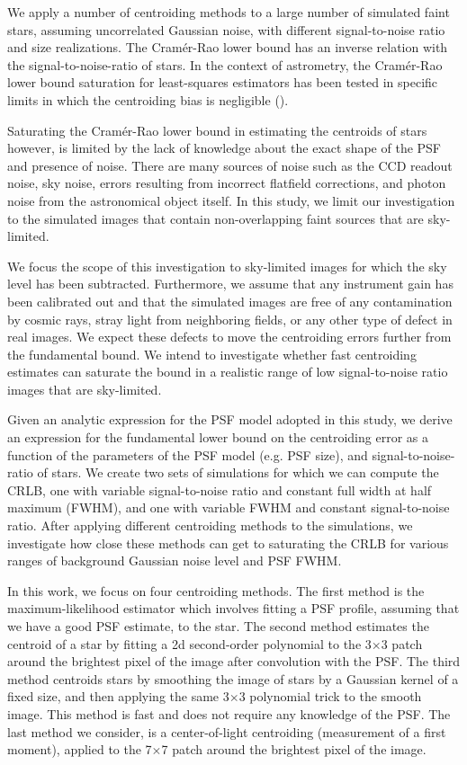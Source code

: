 We apply a number of 
centroiding methods to a large number of simulated faint stars, assuming uncorrelated 
Gaussian noise, with different signal-to-noise ratio and size realizations. 
The Cram\'{e}r-Rao lower bound has an inverse relation with the signal-to-noise-ratio 
of stars. In the context of astrometry, the Cram\'{e}r-Rao lower bound saturation for least-squares estimators has been tested in specific limits in which the centroiding bias is negligible (\citealt{lobos}). 

Saturating the Cram\'{e}r-Rao lower bound in estimating the centroids of stars however, is limited
by the lack of knowledge about the exact shape of the PSF and presence of noise. 
There are many sources of noise such as the CCD readout noise, sky noise, errors resulting from 
incorrect flatfield corrections, and photon noise from the astronomical object itself. 
In this study, we limit our investigation to the simulated images that contain non-overlapping faint sources that are sky-limited. 

We focus the scope of this investigation to sky-limited images for which the sky level has been subtracted. Furthermore, we assume that any instrument gain has been calibrated out and that the 
simulated images are free of any contamination by cosmic rays, stray light from neighboring fields, or 
any other type of defect in real images. We expect these defects to move the centroiding errors further from the 
fundamental bound. We intend to investigate whether fast centroiding estimates can saturate the bound 
in a realistic range of low signal-to-noise ratio images that are sky-limited. 

Given an analytic expression for the PSF model adopted in this study,
we derive an expression for the fundamental lower bound on the centroiding error as
a function of the parameters of the PSF model (e.g. PSF size),
and signal-to-noise-ratio of stars. We create two sets of simulations for which we can 
compute the CRLB, one with variable signal-to-noise ratio and constant full width at half maximum (FWHM), and one 
with variable FWHM and constant signal-to-noise ratio. After applying
different centroiding methods to the simulations, we investigate how close 
these methods can get to saturating the CRLB for various ranges of background 
Gaussian noise level and PSF FWHM.

In this work, we focus on four centroiding methods. The first method is the maximum-likelihood 
estimator which involves fitting a PSF profile, assuming that we have a good PSF estimate, to the star. 
The second method estimates the centroid of a star by fitting a 2d second-order polynomial to 
the 3$\times$3 patch around the brightest pixel of the image after convolution with the PSF. 
The third method centroids stars by
 smoothing the image of stars by a Gaussian kernel of a fixed size,
 and then applying the same 3$\times$3 polynomial trick to the smooth
 image. This method is fast and does not require any knowledge of the 
PSF. The last method we consider, is a center-of-light centroiding 
(measurement of a first moment), applied to the 7$\times$7 patch around the brightest pixel of the image.

